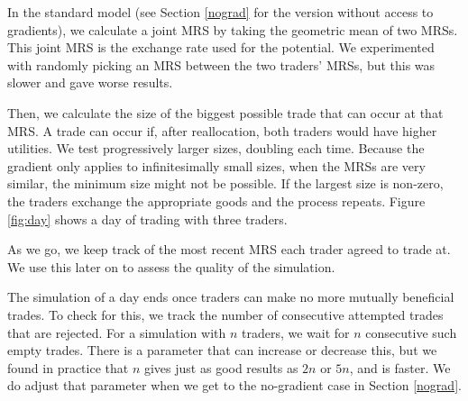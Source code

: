 \documentclass[12pt,a4paper,titlepage]{article}
\begin{document}
In the standard model (see Section \ref{nograd} for the version without access to gradients), we calculate a joint MRS by taking the geometric mean of two MRSs.
This joint MRS is the exchange rate used for the potential.
We experimented with randomly picking an MRS between the two traders' MRSs, but this was slower and gave worse results.

Then, we calculate the size of the biggest possible trade that can occur at that MRS.
A trade can occur if, after reallocation, both traders would have higher utilities.
We test progressively larger sizes, doubling each time.
Because the gradient only applies to infinitesimally small sizes, when the MRSs are very similar, the minimum size might not be possible.
If the largest size is non-zero, the traders exchange the appropriate goods and the process repeats.
Figure \ref{fig:day} shows a day of trading with three traders.

As we go, we keep track of the most recent MRS each trader agreed to trade at.
We use this later on to assess the quality of the simulation.

The simulation of a day ends once traders can make no more mutually beneficial trades.
To check for this, we track the number of consecutive attempted trades that are rejected. 
For a simulation with $n$ traders, we wait for $n$ consecutive such empty trades.
There is a parameter that can increase or decrease this, but we found in practice that $n$ gives just as good results as $2n$ or $5n$, and is faster.
We do adjust that parameter when we get to the no-gradient case in Section \ref{nograd}.
\end{document}
